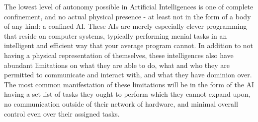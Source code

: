 The lowest level of autonomy possible in Artificial Intelligences is one of complete confinement, and no actual physical presence - at least not in the form of a body of any kind: a confined AI. These AIs are merely especially clever programming that reside on computer systems, typically performing menial tasks in an intelligent and efficient way that your average program cannot. In addition to not having a physical representation of themselves, these intelligences also have abundant limitations on what they are able to do, what and who they are permitted to communicate and interact with, and what they have dominion over. The most common manifestation of these limitations will be in the form of the AI having a set list of tasks they ought to perform which they cannot expand upon, no communication outside of their network of hardware, and minimal overall control even over their assigned tasks.